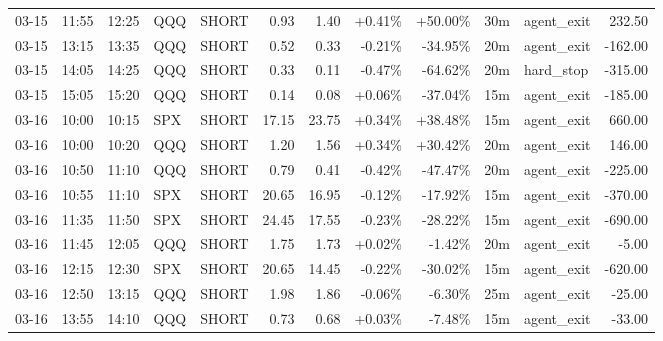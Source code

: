 \documentclass[11pt,a4paper]{article}
\begin{document}
\begin{center}
\begin{longtable}{>{\color{txtmain}}l l l l l r r r r r >{\color{txtmain}}l r}
03-15 & 11:55 & 12:25 & QQQ & SHORT & 0.93 & 1.40 & \textcolor{wingreen}{+0.41\%} & \textcolor{wingreen}{+50.00\%} & 30m & agent\_exit & \textcolor{wingreen}{232.50} \\
03-15 & 13:15 & 13:35 & QQQ & SHORT & 0.52 & 0.33 & \textcolor{lossred}{-0.21\%} & \textcolor{lossred}{-34.95\%} & 20m & agent\_exit & \textcolor{lossred}{-162.00} \\
03-15 & 14:05 & 14:25 & QQQ & SHORT & 0.33 & 0.11 & \textcolor{lossred}{-0.47\%} & \textcolor{lossred}{-64.62\%} & 20m & hard\_stop & \textcolor{lossred}{-315.00} \\
03-15 & 15:05 & 15:20 & QQQ & SHORT & 0.14 & 0.08 & \textcolor{wingreen}{+0.06\%} & \textcolor{lossred}{-37.04\%} & 15m & agent\_exit & \textcolor{lossred}{-185.00} \\
03-16 & 10:00 & 10:15 & SPX & SHORT & 17.15 & 23.75 & \textcolor{wingreen}{+0.34\%} & \textcolor{wingreen}{+38.48\%} & 15m & agent\_exit & \textcolor{wingreen}{660.00} \\
03-16 & 10:00 & 10:20 & QQQ & SHORT & 1.20 & 1.56 & \textcolor{wingreen}{+0.34\%} & \textcolor{wingreen}{+30.42\%} & 20m & agent\_exit & \textcolor{wingreen}{146.00} \\
03-16 & 10:50 & 11:10 & QQQ & SHORT & 0.79 & 0.41 & \textcolor{lossred}{-0.42\%} & \textcolor{lossred}{-47.47\%} & 20m & agent\_exit & \textcolor{lossred}{-225.00} \\
03-16 & 10:55 & 11:10 & SPX & SHORT & 20.65 & 16.95 & \textcolor{lossred}{-0.12\%} & \textcolor{lossred}{-17.92\%} & 15m & agent\_exit & \textcolor{lossred}{-370.00} \\
03-16 & 11:35 & 11:50 & SPX & SHORT & 24.45 & 17.55 & \textcolor{lossred}{-0.23\%} & \textcolor{lossred}{-28.22\%} & 15m & agent\_exit & \textcolor{lossred}{-690.00} \\
03-16 & 11:45 & 12:05 & QQQ & SHORT & 1.75 & 1.73 & \textcolor{wingreen}{+0.02\%} & \textcolor{lossred}{-1.42\%} & 20m & agent\_exit & \textcolor{lossred}{-5.00} \\
03-16 & 12:15 & 12:30 & SPX & SHORT & 20.65 & 14.45 & \textcolor{lossred}{-0.22\%} & \textcolor{lossred}{-30.02\%} & 15m & agent\_exit & \textcolor{lossred}{-620.00} \\
03-16 & 12:50 & 13:15 & QQQ & SHORT & 1.98 & 1.86 & \textcolor{lossred}{-0.06\%} & \textcolor{lossred}{-6.30\%} & 25m & agent\_exit & \textcolor{lossred}{-25.00} \\
03-16 & 13:55 & 14:10 & QQQ & SHORT & 0.73 & 0.68 & \textcolor{wingreen}{+0.03\%} & \textcolor{lossred}{-7.48\%} & 15m & agent\_exit & \textcolor{lossred}{-33.00} \\

\end{longtable}
\end{center}
\end{document}
